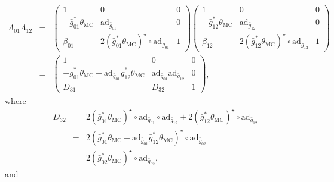 \documentclass[letterpaper,10pt, oneside]{article} %
\newcommand{\TM}{\theta_{\scriptscriptstyle \mathrm{MC}}}
\newcommand{\ad}{\mathrm{ad}}
\newcommand{\bg}{\bar{g}}
\begin{document}
\begin{eqnarray*}
  \Lambda_{\scriptscriptstyle 01}\Lambda_{\scriptscriptstyle 12}&=&
  \left(\begin{array}{ccc}
1&0&0\\
-\bg_{\scriptscriptstyle 01}^*\TM&\ad_{\bg_{\scriptscriptstyle 01}}&0\\
\beta_{\scriptscriptstyle 01}&2(\bg_{\scriptscriptstyle 01}^*\TM)^\star\circ \ad_{\bg_{\scriptscriptstyle 01}}&1
\end{array}\right)
\left(\begin{array}{ccc}
1&0&0\\
-\bg_{\scriptscriptstyle 12}^*\TM&\ad_{\bg_{\scriptscriptstyle 12}}&0\\
\beta_{\scriptscriptstyle 12}&2(\bg_{\scriptscriptstyle 12}^*\TM)^\star\circ \ad_{\bg_{\scriptscriptstyle 12}}&1
\end{array}\right) \\
&=&\left(\begin{array}{ccc}
1&0&0\\
-\bg_{\scriptscriptstyle 01}^*\TM-\ad_{\bg_{\scriptscriptstyle 01}}\bg_{\scriptscriptstyle 12}^*\TM&\ad_{\bg_{\scriptscriptstyle 01}}\ad_{\bg_{\scriptscriptstyle 12}}&0\\
D_{\scriptscriptstyle 31}&D_{\scriptscriptstyle 32} &1
\end{array}\right),
\end{eqnarray*}
where
\begin{eqnarray*}
  D_{\scriptscriptstyle 32}&=&2(\bg_{\scriptscriptstyle 01}^*\TM)^\star\circ \ad_{\bg_{\scriptscriptstyle 01}}\circ\ad_{\bg_{\scriptscriptstyle 12}}+2(\bg_{\scriptscriptstyle 12}^*\TM)^\star\circ \ad_{\bg_{\scriptscriptstyle 12}}\\
  &=&2(\bg_{\scriptscriptstyle 01}^*\TM+\ad_{\bg_{\scriptscriptstyle 01}}\bg_{\scriptscriptstyle 12}^*\TM)^\star\circ\ad_{\bg_{\scriptscriptstyle 02}} \\
  &=&2(\bg_{\scriptscriptstyle 02}^*\TM)^\star\circ\ad_{\bg_{\scriptscriptstyle 02}},
\end{eqnarray*}
and
\end{document}
